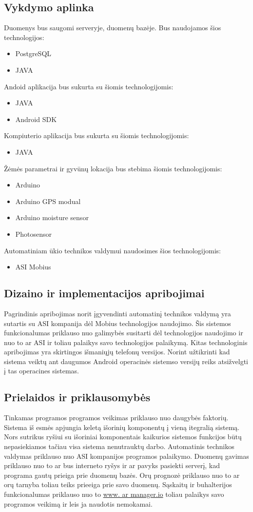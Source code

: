 \documentclass[oneside]{VUMIFPSkursinis}
\begin{document}
\subsection{Vykdymo aplinka}
Duomenys bus saugomi serveryje, duomenų bazėje. Bus naudojamos šios technologijos:
	\begin{itemize}
		\item PostgreSQL
		\item JAVA
	\end{itemize}
Andoid aplikacija bus sukurta su šiomis technologijomis:
	\begin{itemize}
		\item JAVA
		\item Android SDK
	\end{itemize}
Kompiuterio aplikacija bus sukurta su šiomis technologijomis:
	\begin{itemize}
		\item JAVA
	\end{itemize}
Žėmės parametrai ir gyvūnų lokacija bus stebima šiomis technologijomis:
	\begin{itemize}
		\item Arduino
		\item Arduino GPS modual
		\item Arduino moisture sensor
		\item Photosensor
	\end{itemize}
Automatiniam ūkio technikos valdymui naudosimes šios technologijomis:
	\begin{itemize}		
		\item ASI Mobius
	\end{itemize}
\subsection{Dizaino ir implementacijos apribojimai}
Pagrindinis apribojimas norit įgyvendinti automatinį technikos valdymą yra sutartis su ASI kompanija dėl Mobius technologijos naudojimo. Šis sistemos funkcionalumas priklauso nuo galimybės susitarti dėl technologijos naudojimo ir nuo to ar ASI ir toliau palaikys savo technologijos palaikymą. Kitas technologinis apribojimas yra skirtingos išmaniųjų telefonų versijos. Norint užtikrinti kad sistema veiktų ant daugumos Android operacinės sistemso versijų reiks atsižvelgti į tas operacines sistemas. 


\subsection{Prielaidos ir priklausomybės}
Tinkamas programos programos veikimas priklauso nuo daugybės faktorių. Sistema iš esmės apjungia keletą išorinių komponentų į vieną itegralią sistemą. Nors sutrikus ryšiui su išoriniai komponentais kaikurios sistemos funkcijos būtų nepasiekiamos tačiau visa sistema nenutrauktų darbo. Automatinis technikos valdymas priklauso nuo ASI kompanijos programos palaikymo. Duomenų gavimas priklauso nuo to ar bus interneto ryšys ir ar pavyks pasiekti serverį, kad programa gautų prieiga prie duomenų bazės. Orų prognozė priklauso nuo to ar orų tarnyba toliau teiks prieeiga prie savo duomenų. Sąskaitų ir buhalterijos funkcionalumas priklauso nuo to \url{www. ar manager.io} toliau palaikys savo programos veikimą ir leis ja naudotis nemokamai.
\end{document}
